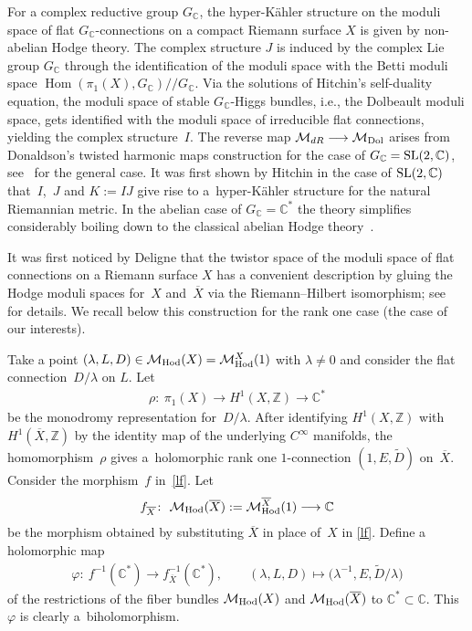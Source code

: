 For a complex reductive group $G_{\mathbb C}$, the hyper-K\"ahler structure on the moduli space of f\/lat $G_{\mathbb C}$-connections on a compact Riemann surface $X$ is given by non-abelian Hodge theory. The complex structure $J$ is induced by the complex Lie group $G_{\mathbb C}$ through the identif\/ication of the moduli space with the Betti moduli space $\operatorname{Hom}(\pi_1(X), G_{\mathbb C})/\!\!/G_{\mathbb C}$. Via the solutions of Hitchin's self-duality equation, the moduli space of stable $G_{\mathbb C}$-Higgs bundles, i.e., the Dolbeault moduli space, gets identif\/ied with the moduli space of irreducible f\/lat connections, yielding the complex structure~$I$. The reverse map ${\mathcal M}_{dR}  \longrightarrow \mathcal M_{\rm Dol}$ arises from Donaldson's twisted harmonic maps construction \cite{Do} for the case of $G_{\mathbb C}={\rm SL }(2,\mathbb C)$, see~\cite{Co} for the general case. It was f\/irst shown by Hitchin in the case of ${\rm SL}(2,\mathbb C)$ that~$I$,~$J$ and $K := IJ$ give rise to a~hyper-K\"ahler structure for the natural Riemannian metric. In the abelian case of $G_{\mathbb C} = \mathbb C^*$ the theory simplif\/ies considerably boiling down to the classical abelian Hodge theory~\cite{GX}.

It was f\/irst noticed by Deligne that the twistor space of the moduli space of f\/lat connections on a Riemann surface $X$ has a convenient description by gluing the Hodge moduli spaces for~$X$ and~$\overline X$ via the Riemann--Hilbert isomorphism; see~\cite{Si95,Si08} for details. We recall below this construction for the rank one case (the case of our interests).

Take a point $(\lambda, L, D) \in \mathcal M_{\rm Hod}(X) = \mathcal M^X_{\rm Hod}(1)$ with $\lambda \neq 0$ and consider the f\/lat connec\-tion~$D/\lambda$ on $L$. Let
\begin{gather*}\rho \colon \ \pi_1(X)  \longrightarrow H^1(X, {\mathbb Z}) \longrightarrow \mathbb C^*\end{gather*}
be the monodromy representation for~$D/\lambda$. After identifying $H^1(X, {\mathbb Z})$ with $H^1(\overline{X}, {\mathbb Z})$ by the identity map of the underlying $C^\infty$ manifolds, the homomorphism~$\rho$ gives a~holomorphic rank one $1$-connection $(1, E, \widetilde D)$ on~$\overline{X}$. Consider the morphism~$f$ in~\eqref{lf}. Let
\begin{gather*}
f_{\overline X} \colon \ {\mathcal M}_{\rm Hod}(\overline{X}) := {\mathcal M}^{\overline X}_{\rm Hod}(1)  \longrightarrow {\mathbb C}
\end{gather*}
be the morphism obtained by substituting $\overline X$ in place of~$X$ in \eqref{lf}. Def\/ine a holomorphic map
\begin{gather}\label{hodge-gluing}
\varphi \colon \  f^{-1}({\mathbb C}^*)  \longrightarrow f^{-1}_{\overline X}({\mathbb C}^*) ,\qquad (\lambda, L, D) \longmapsto \big(\lambda^{-1}, E, \widetilde{D}/\lambda\big)
\end{gather}
of the restrictions of the f\/iber bundles ${\mathcal M}_{\rm Hod}(X)$ and ${\mathcal M}_{\rm Hod}(\overline{X})$ to ${\mathbb C}^* \subset \mathbb C$. This $\varphi$ is clearly a~biholomorphism.

